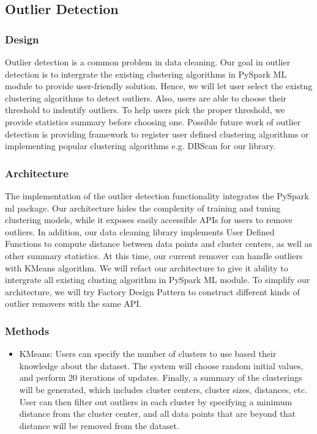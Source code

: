 \documentclass[sigconf]{acmart}
\begin{document}
\subsection{Outlier Detection}
\subsubsection{Design} 
Outlier detection is a common problem in data cleaning. Our goal in outlier detection is to intergrate the existing clustering algorithms in PySpark ML module to provide user-friendly solution. Hence, we will let user select the existng clustering algorithms to detect outliers. Also, users are able to choose their threshold to indentify outliers. To help users pick the proper threshold, we provide statistics summary before choosing one. Possible future work of outlier detection is providing framework to register user defined clustering algorithms or implementing popular clustering algorithms e.g. DBScan\cite{DBScan} for our library.

\subsubsection{Architecture}
The implementation of the outlier detection functionality integrates the PySpark ml package. Our architecture hides the complexity of training and tuning clustering models, while it exposes easily accessible APIs for users to remove outliers. In addition, our data cleaning library implements User Defined Functions to compute distance between data points and cluster centers, as well as other summary statistics. At this time, our current remover can handle outliers with KMeans algorithm. We will refact our architecture to give it ability to intergrate all existing clusting algorithm in PySpark ML module. To simplify our architecture, we will try Factory Design Pattern to construct different kinds of outlier removers with the same API.

\subsubsection{Methods}
\begin{itemize}
	\item{KMeans}\cite{KMeans}: Users can specify the number of clusters to use based their knowledge about the dataset. The system will choose random initial values, and perform 20 iterations of updates. Finally, a summary of the clusterings will be generated, which includes cluster centers, cluster sizes, distances, etc. User can then filter out outliers in each cluster by specifying a minimum distance from the cluster center, and all data points that are beyond that distance will be removed from the dataset.
\end{itemize}
\end{document}
